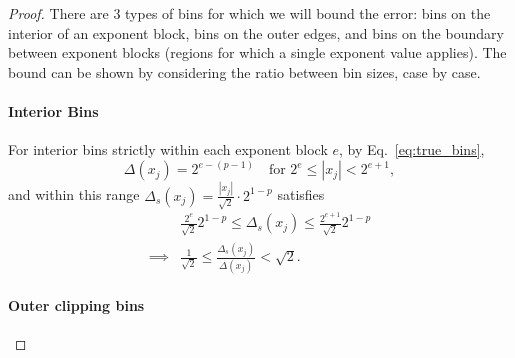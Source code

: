 \documentclass[10pt,a4paper]{amsart}
\begin{document}
\begin{proof}

There are 3 types of bins for which we will bound the error: bins on the interior of an exponent block, bins on the outer edges, and bins on the boundary between exponent blocks (regions for which a single exponent value applies). The bound can be shown by considering the ratio between bin sizes, case by case.

\paragraph{Interior Bins}
For interior bins strictly within each exponent block $e$, by Eq.~\eqref{eq:true_bins},
\begin{equation}
    \label{eq:real_bins}
    \Delta(x_j) = 2^{e-(p-1)} \quad \text{for } 2^e \leq |x_j| < 2^{e+1},
\end{equation}
and within this range $\Delta_s(x_j) = \frac{|x_j|}{\sqrt{2}} \cdot 2^{1-p}$ satisfies
\begin{equation}
    \begin{aligned}
    &\frac{2^e}{\sqrt{2}}2^{1-p} \leq \Delta_s(x_j) \leq \frac{2^{e+1}}{\sqrt{2}}2^{1-p}\\
    \implies &\frac{1}{\sqrt{2}} \leq \frac{\Delta_s(x_j)}{\Delta(x_j)} < \sqrt{2}.
    \end{aligned}
\end{equation}

\paragraph{Outer clipping bins}


\end{proof}
\end{document}
